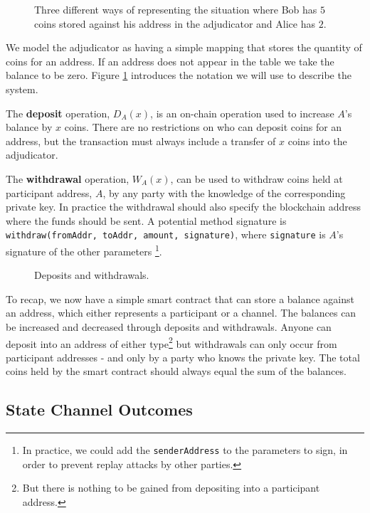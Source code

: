 \begin{figure}[h]\centering
  \makebox[\textwidth][c]{}
  \caption{
    Three different ways of representing the situation where Bob has $5$ coins
    stored against his address in the adjudicator and Alice has $2$.
  }\label{fig:balance-notation}
\end{figure}

We model the adjudicator as having a simple mapping that stores the quantity of coins for
an address.
If an address does not appear in the table we take the balance to be zero.
Figure \ref{fig:balance-notation} introduces the notation we will use to describe the system.

The \textbf{deposit} operation, $D_A(x)$, is an on-chain operation used to increase $A$'s balance by $x$ coins.
There are no restrictions on who can deposit coins for an address, but the
transaction must always include a transfer of $x$ coins into the adjudicator.

The \textbf{withdrawal} operation, $W_A(x)$, can be used to withdraw coins held at participant address, $A$, by any
party with the knowledge of the corresponding private key. 
In practice the withdrawal should also specify the blockchain address where the funds should be sent.
A potential method signature is \texttt{withdraw(fromAddr, toAddr, amount, signature)}, 
where \texttt{signature} is $A$'s signature of the other parameters
\footnote{In practice, we could add the \texttt{senderAddress} to the parameters to sign,
in order to prevent replay attacks by other parties.}.

\begin{figure}[h]\centering
  \makebox[\textwidth][c]{}
  \caption{Deposits and withdrawals.}\label{fig:deposit-withdrawal}
\end{figure}

To recap, we now have a simple smart contract that can store a balance against an address, which either represents a participant or a channel.
The balances can be increased and decreased through deposits and withdrawals.
Anyone can deposit into an address of either type\footnote{But there is nothing to be gained from depositing into a participant address.} but withdrawals can only occur from 
participant addresses - and only by a party who knows the private key.
The total coins held by the smart contract should always equal the sum of the balances.

\subsection{State Channel Outcomes}

